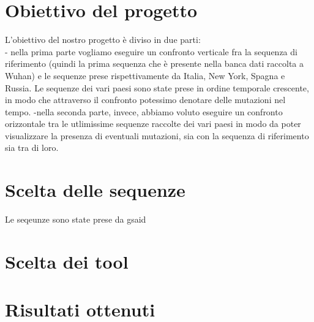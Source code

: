 \documentclass[a4paper,10pt]{article}
\begin{document}
\section*{Obiettivo del progetto}
L'obiettivo del nostro progetto è diviso in due parti: \\
	- nella prima parte vogliamo eseguire un confronto verticale fra la sequenza di riferimento (quindi la prima sequenza che è presente nella banca dati raccolta a Wuhan) e le sequenze prese rispettivamente da Italia, New York, Spagna e Russia. Le sequenze dei vari paesi sono state prese in ordine temporale crescente, in modo che attraverso il confronto potessimo denotare delle mutazioni nel tempo.
	-nella seconda parte, invece, abbiamo voluto eseguire un confronto orizzontale tra le utlimissime sequenze raccolte dei vari paesi in modo da poter visualizzare la presenza di eventuali mutazioni, sia con la sequenza di riferimento sia tra di loro. 

\section*{Scelta delle sequenze}
Le seqeunze sono state prese da gsaid

\section*{Scelta dei tool}

\section*{Risultati ottenuti}
\end{document}
